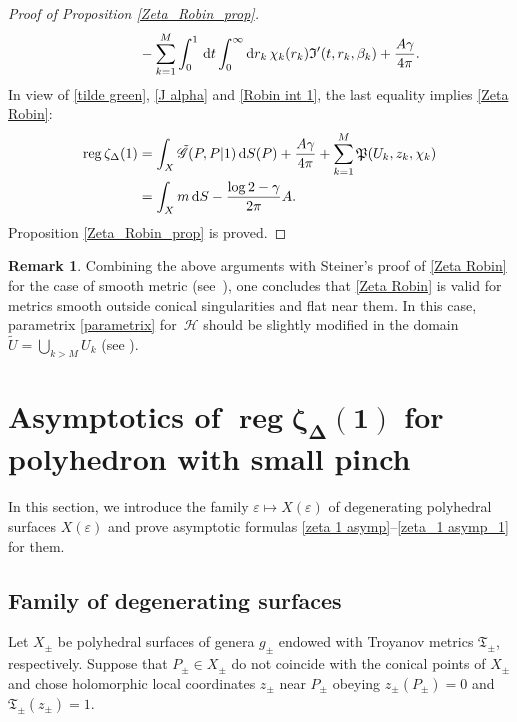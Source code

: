 \documentclass[pdftex]{sigma}
\numberwithin{equation}{section}
\theoremstyle{definition}
\newtheorem{Remark}[Theorem]{Remark}
\begin{document}
\begin{proof}[Proof of Proposition \ref{Zeta_Robin_prop}]
\begin{gather*}
\phantom{\qquad=}{}-\sum_{k=1}^M\int_0^{1}\, {\rm d}t\int_{0}^{\infty}{\rm d}r_k\, \chi_k(r_k)\mathfrak{I}'(t,r_k,\beta_k)+\frac{A\gamma}{4\pi}.
\end{gather*}
In view of \eqref{tilde green}, \eqref{J alpha} and \eqref{Robin int 1}, the last equality implies \eqref{Zeta Robin}:
\begin{align*}
\operatorname{reg}\zeta_\Delta(1)&=\int_X\tilde{\mathscr{G}}(P,P|1)\, {\rm d }S(P)+\frac{A\gamma}{4\pi}+\sum_{k=1}^M\mathfrak{P}(U_k,z_k,\chi_k)\\
&=\int_{X}m\, {\rm d }S-\frac{\log 2-\gamma}{2\pi}A.
\end{align*}
Proposition \ref{Zeta_Robin_prop} is proved.
\end{proof}

\begin{Remark}\label{smoth conical case rem 2}
Combining the above arguments with Steiner's proof of \eqref{Zeta Robin} for the case of smooth metric (see~\cite{Steiner}), one concludes that \eqref{Zeta Robin} is valid for metrics smooth outside conical singularities and flat near them. In this case, parametrix \eqref{parametrix} for~$\mathscr{H}$ should be slightly modified in the domain $\tilde{U}=\bigcup_{k>M}U_k$ (see \cite[formula~(51)]{Steiner}).
\end{Remark}

\section[Asymptotics of reg zeta\_Delta(1) for polyhedron with small pinch]{Asymptotics of $\boldsymbol{\operatorname{reg} \zeta_\Delta(1)}$ for polyhedron with small pinch}
\label{asymp sec}
In this section, we introduce the family $\varepsilon\mapsto X(\varepsilon)$ of degenerating polyhedral surfaces $X(\varepsilon)$ and prove asymptotic formulas \eqref{zeta 1 asymp}--\eqref{zeta_1 asymp_1} for them.

\subsection*{Family of degenerating surfaces} Let $X_\pm$ be polyhedral surfaces of genera $g_\pm$ endowed with Troyanov metrics $\mathfrak{T}_\pm$, respectively. Suppose that $P_\pm\in X_\pm$ do not coincide with the conical points of $X_\pm$ and chose holomorphic local coordinates $z_\pm$ near $P_\pm$ obeying $z_\pm(P_\pm)=0$ and $\mathfrak{T}_\pm(z_\pm)=1$.
\end{document}
